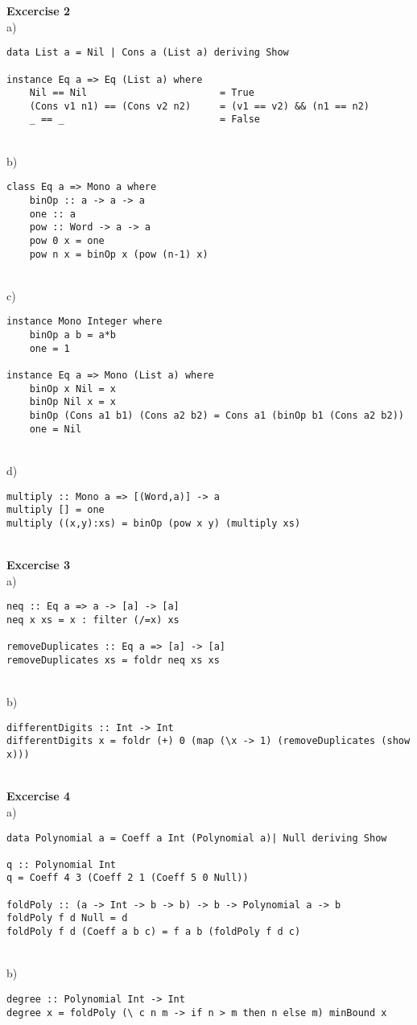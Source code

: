 \documentclass[a4paper,12pt,oneside]{book}
\begin{document}
\textbf{Excercise 2} \\%
a)
\begin{lstlisting}
data List a = Nil | Cons a (List a) deriving Show

instance Eq a => Eq (List a) where
    Nil == Nil                       = True
    (Cons v1 n1) == (Cons v2 n2)     = (v1 == v2) && (n1 == n2)
    _ == _                           = False
\end{lstlisting}
~\\     
b)
\begin{lstlisting}
class Eq a => Mono a where
    binOp :: a -> a -> a 
    one :: a
    pow :: Word -> a -> a
    pow 0 x = one
    pow n x = binOp x (pow (n-1) x)
\end{lstlisting}
~\\     
c)
\begin{lstlisting}
instance Mono Integer where
    binOp a b = a*b
    one = 1
    
instance Eq a => Mono (List a) where
    binOp x Nil = x
    binOp Nil x = x
    binOp (Cons a1 b1) (Cons a2 b2) = Cons a1 (binOp b1 (Cons a2 b2))
    one = Nil
\end{lstlisting}
~\\     
d)
\begin{lstlisting}
multiply :: Mono a => [(Word,a)] -> a
multiply [] = one
multiply ((x,y):xs) = binOp (pow x y) (multiply xs)
\end{lstlisting}
~\\     

\textbf{Excercise 3} \\%
a) 
\begin{lstlisting}
neq :: Eq a => a -> [a] -> [a]
neq x xs = x : filter (/=x) xs

removeDuplicates :: Eq a => [a] -> [a]
removeDuplicates xs = foldr neq xs xs
\end{lstlisting}
~\\     
b)
\begin{lstlisting}
differentDigits :: Int -> Int
differentDigits x = foldr (+) 0 (map (\x -> 1) (removeDuplicates (show x))) 
\end{lstlisting}
~\\     

\textbf{Excercise 4} \\%
a)
\begin{lstlisting}
data Polynomial a = Coeff a Int (Polynomial a)| Null deriving Show

q :: Polynomial Int
q = Coeff 4 3 (Coeff 2 1 (Coeff 5 0 Null))

foldPoly :: (a -> Int -> b -> b) -> b -> Polynomial a -> b
foldPoly f d Null = d
foldPoly f d (Coeff a b c) = f a b (foldPoly f d c)
\end{lstlisting}
~\\    
b)
\begin{lstlisting}
degree :: Polynomial Int -> Int
degree x = foldPoly (\ c n m -> if n > m then n else m) minBound x 
\end{lstlisting}
~\\    
\end{document}
